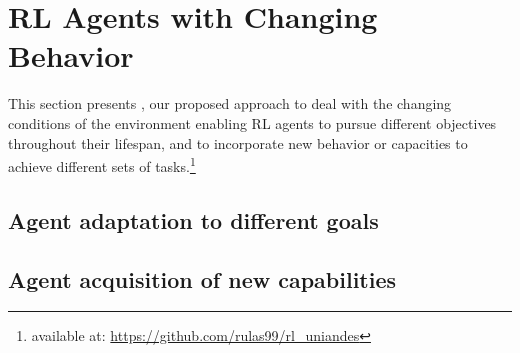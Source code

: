 
\section{\ac{RL} Agents with Changing Behavior}
\label{sec:implementation}

This section presents \adaptiverl, our proposed approach to deal with the changing conditions of the 
environment enabling \ac{RL} agents to pursue different objectives throughout their lifespan, and to 
incorporate new behavior or capacities to achieve different sets of tasks.\footnote{available at: \url{https://github.com/rulas99/rl_uniandes}}

\subsection{Agent adaptation to different goals}


\subsection{Agent acquisition of new capabilities}


\endinput

